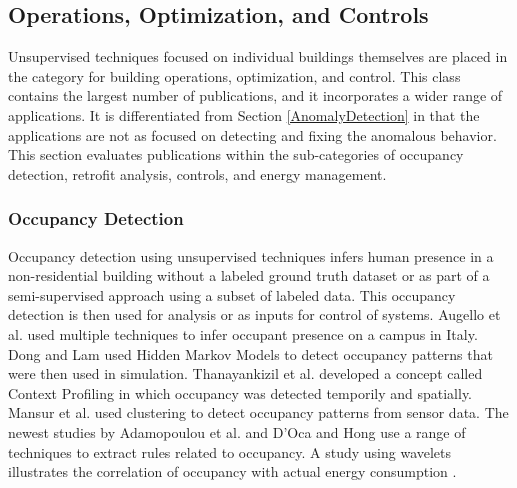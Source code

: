 \subsection{Operations, Optimization, and Controls}
\label{Operations}
Unsupervised techniques focused on individual buildings themselves are placed in the category for building operations, optimization, and control. This class contains the largest number of publications, and it incorporates a wider range of applications. It is differentiated from Section \ref{AnomalyDetection} in that the applications are not as focused on detecting and fixing the anomalous behavior. This section evaluates publications within the sub-categories of occupancy detection, retrofit analysis, controls, and energy management. 

\subsubsection{Occupancy Detection}
Occupancy detection using unsupervised techniques infers human presence in a non-residential building without a labeled ground truth dataset or as part of a semi-supervised approach using a subset of labeled data. This occupancy detection is then used for analysis or as inputs for control of systems. Augello et al. \cite{augello_sensor_2011} used multiple techniques to infer occupant presence on a campus in Italy. Dong and Lam \cite{dong_building_2011} used Hidden Markov Models to detect occupancy patterns that were then used in simulation. Thanayankizil et al. \cite{thanayankizil_softgreen:_2012} developed a concept called Context Profiling in which occupancy was detected temporily and spatially. Mansur et al. \cite{mansur_learning_2015} used clustering to detect occupancy patterns from sensor data. The newest studies by Adamopoulou et al. \cite{adamopoulou_context-aware_2015} and D'Oca and Hong \cite{doca_occupancy_2015} use a range of techniques to extract rules related to occupancy. A study using wavelets illustrates the correlation of occupancy with actual energy consumption \cite{ahn_correlation_2016}.


